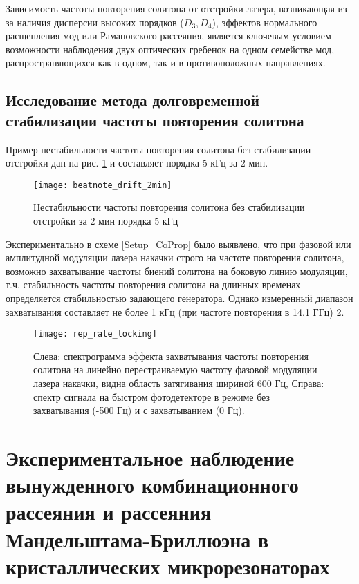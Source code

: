 Зависимость частоты повторения солитона от отстройки лазера, возникающая из-за наличия дисперсии высоких порядков ($D_3,D_4$), эффектов нормального расщепления мод или Рамановского рассеяния, является ключевым условием возможности наблюдения двух оптических гребенок на одном семействе мод, распространяющихся как в одном, так и в противоположных направлениях.

\subsection{Исследование метода долговременной стабилизации частоты повторения солитона}

Пример нестабильности частоты повторения солитона без стабилизации отстройки дан на рис. \ref{beatnote_drift_2min} и составляет порядка 5 кГц за 2 мин.

\begin{figure}[ht]
\centering
  \texttt{[image: beatnote\_drift\_2min]}
  \caption{Нестабильности частоты повторения солитона без стабилизации отстройки за 2 мин порядка 5 кГц}
  \label{beatnote_drift_2min}
\end{figure}

Экспериментально в схеме \ref{Setup_CoProp} было выявлено, что при фазовой или амплитудной модуляции лазера накачки строго на частоте повторения солитона, возможно захватывание частоты биений солитона на боковую линию модуляции, т.ч. стабильность частоты повторения солитона на длинных временах определяется стабильностью задающего генератора. Однако измеренный диапазон захватывания составляет не более 1 кГц (при частоте повторения в 14.1 ГГц) \ref{rep_rate_locking}.

\begin{figure}[ht]
\centering
  \texttt{[image: rep\_rate\_locking]}
  \caption{Слева: спектрограмма эффекта захватывания частоты повторения солитона на линейно перестраиваемую частоту фазовой модуляции лазера накачки, видна область затягивания шириной 600 Гц, Справа: спектр сигнала на быстром фотодетекторе в режиме без захватывания (-500 Гц) и с захватыванием (0 Гц).}
  \label{rep_rate_locking}
\end{figure}


\section{Экспериментальное наблюдение вынужденного комбинационного рассеяния и рассеяния Мандельштама-Бриллюэна в кристаллических микрорезонаторах}

